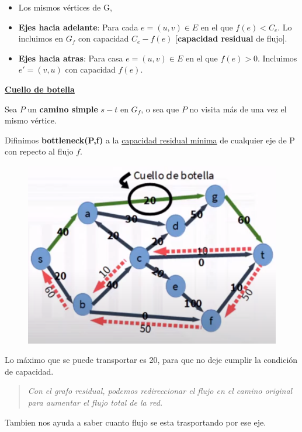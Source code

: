 \documentclass{article}
\begin{document}
\begin{itemize}
    \item Los mismos vértices de G,
    \item \textbf{Ejes hacia adelante}: Para cada \(e=(u,v) \in E\) en el que \(f(e) < C_e\). 
    Lo incluimos en \(G_f\) con capacidad \(C_e-f(e)\) [\textbf{capacidad residual} de flujo].
    \item \textbf{Ejes hacia atras}: Para casa \(e=(u,v) \in E\) en el que \(f(e) > 0\). 
    Incluimos \(e'=(v,u)\) con capacidad \(f(e)\).
\end{itemize}

\noindent
\underline{\textbf{Cuello de botella}}

Sea \(P\) un \textbf{camino simple} \(s-t\) en \(G_f\), o sea que \(P\) no visita más de una vez el mismo vértice.

Difinimos \textbf{bottleneck(P,f)} a la \underline{capacidad residual mínima} de cualquier eje de P con repecto al flujo \(f\).

\begin{figure}[h!]
    \includegraphics[width=\linewidth]{imagenes/cuello-de-botella.png}
\end{figure}

Lo máximo que se puede transportar es 20, para que no deje cumplir la condición de capacidad.

\begin{quote}
    \textit{Con el grafo residual, podemos redireccionar el flujo en el camino original para aumentar el flujo total de la red.}
\end{quote}

Tambien nos ayuda a saber cuanto flujo se esta trasportando por ese eje.
\end{document}
